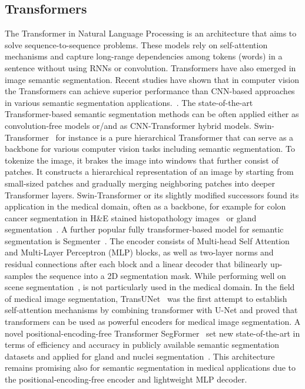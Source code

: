 \subsection{Transformers}
The Transformer in  Natural Language Processing is an architecture that aims to solve
sequence-to-sequence problems.
These models rely on self-attention mechanisms and capture long-range dependencies among tokens
(words) in a sentence without using RNNs or convolution. Transformers have also emerged in image
semantic segmentation. Recent studies have shown that in computer vision the Transformers can
achieve superior performance than CNN-based approaches in various semantic segmentation applications.~\cite{nguyen2022evaluating}.
The state-of-the-art Transformer-based semantic segmentation methods can be often applied either as
convolution-free models or/and as CNN-Transformer hybrid models. Swin-Transformer~\cite{liu2021swin}
for instance is a pure hierarchical Transformer that can serve as a  backbone for various computer
vision tasks including semantic segmentation. To tokenize the image, it brakes the image into windows
that further consist of patches. It constructs a hierarchical representation of an image by starting
from small-sized patches and gradually merging neighboring patches into deeper Transformer layers.
Swin-Transformer or its slightly modified successors found its application in the medical domain,
often as a backbone, for example for colon cancer segmentation in H\&E stained histopathology
images~\cite{qian2022transformer} or gland segmentation~\cite{lin2022ds}. A further popular fully
transformer-based model for semantic segmentation is Segmenter~\cite{strudel2021segmenter}.
The encoder consists of Multi-head Self Attention and Multi-Layer Perceptron (MLP) blocks, as well
as two-layer norms and residual connections after each block and a linear decoder that bilinearly
up-samples the sequence into a 2D segmentation mask. While performing well on scene
segmentation~\cite{strudel2021segmenter}, is not particularly used in the medical domain.
In the field of medical image segmentation, TransUNet~\cite{chen2021transunet} was the first attempt
to establish self-attention mechanisms by combining transformer with U-Net and proved that
transformers can be used as powerful encoders for medical image segmentation.
A novel positional-encoding-free Transformer SegFormer~\cite{xie2021segformer}
set new state-of-the-art in terms of efficiency and accuracy in publicly available semantic segmentation
datasets and applied for gland and nuclei segmentation~\cite{lin2022ds}.
This architecture remains promising also for semantic segmentation in medical
applications due to the positional-encoding-free encoder and lightweight MLP decoder.


